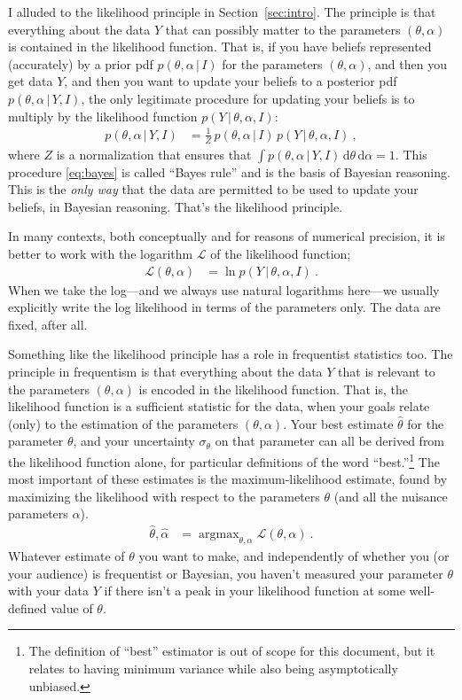 \documentclass{article}
\newcommand{\sectionname}{Section}
\newcommand{\secref}[1]{\sectionname~\ref{#1}}
\newcommand{\dd}{\mathrm{d}}
\newcommand{\given}{\,|\,}
\DeclareMathOperator*{\argmax}{argmax}
\begin{document}
I alluded to the likelihood principle in \secref{sec:intro}.
The principle is that everything about the data $Y$ that can possibly matter to the parameters $(\theta,\alpha)$ is contained in the likelihood function.
That is, if you have beliefs represented (accurately) by a prior pdf $p(\theta,\alpha\given I)$ for the parameters $(\theta,\alpha)$,
and then you get data $Y$,
and then you want to update your beliefs to a posterior pdf $p(\theta,\alpha\given Y,I)$, the only legitimate procedure for updating your beliefs is to multiply by the likelihood function $p(Y\given\theta,\alpha,I)$:
\begin{align}
    p(\theta,\alpha\given Y,I) &= \frac{1}{Z}\,p(\theta,\alpha\given I)\,p(Y\given\theta,\alpha,I) ~,\label{eq:bayes}
\end{align}
where $Z$ is a normalization that ensures that $\int p(\theta,\alpha\given Y,I)\,\dd\theta\,\dd\alpha=1$.
This procedure \eqref{eq:bayes} is called ``Bayes rule'' and is the basis of Bayesian reasoning.
This is the \emph{only way} that the data are permitted to be used to update your beliefs, in Bayesian reasoning.
That's the likelihood principle.

In many contexts, both conceptually and for reasons of numerical precision, it is better to work with the logarithm $\mathscr{L}$ of the likelihood function;
\begin{align}
    \mathscr{L}(\theta,\alpha) &= \ln p(Y\given\theta,\alpha,I) ~.
\end{align}
When we take the log---and we always use natural logarithms here---we usually explicitly write the log likelihood in terms of the parameters only.
The data are fixed, after all.

Something like the likelihood principle has a role in frequentist statistics too.
The principle in frequentism is that everything about the data $Y$ that is relevant to the parameters $(\theta,\alpha)$ is encoded in the likelihood function.
That is, the likelihood function is a sufficient statistic for the data, when your goals relate (only) to the estimation of the parameters $(\theta,\alpha)$.
Your best estimate $\hat{\theta}$ for the parameter $\theta$, and your uncertainty $\sigma_\theta$ on that parameter can all be derived from the likelihood function alone, for particular definitions of the word ``best.''\footnote{%
The definition of ``best'' estimator is out of scope for this document, but it relates to having minimum variance while also being asymptotically unbiased.}
The most important of these estimates is the maximum-likelihood estimate, found by maximizing the likelihood with respect to the parameters $\theta$ (and all the nuisance parameters $\alpha$).
\begin{align}
    \hat{\theta},\hat{\alpha} &= \argmax_{\theta,\alpha} \mathscr{L}(\theta,\alpha) ~.\label{eq:ML}
\end{align}
Whatever estimate of $\theta$ you want to make, and independently of whether you (or your audience) is frequentist or Bayesian, you haven't measured your parameter $\theta$ with your data $Y$ if there isn't a peak in your likelihood function at some well-defined value of $\theta$.
\end{document}
